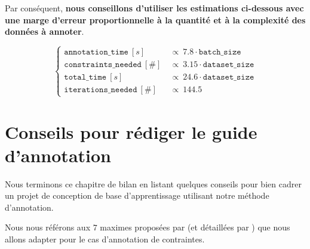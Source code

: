 			Par conséquent, \textbf{nous conseillons d'utiliser les estimations ci-dessous avec une marge d'erreur proportionnelle à la quantité et à la complexité des données à annoter}.
			
		\begin{equation}
			\label{equation:5.5-GUIDE-COUTS}
			\begin{cases}
				\texttt{annotation\_time}~[s] &
					~\propto~7.8 \cdot \texttt{batch\_size} \\
				\texttt{constraints\_needed}~[\#] &
					~\propto~3.15 \cdot \texttt{dataset\_size} \\
				\texttt{total\_time}~[s] &
					~\propto~24.6 \cdot \texttt{dataset\_size} \\
				\texttt{iterations\_needed}~[\#] &
					~\propto~144.5
			\end{cases}
		\end{equation}
	
	
	\newpage
	\section{Conseils pour rédiger le guide d'annotation}
		\label{section:5.6-GUIDE-REDIGER}
		
		Nous terminons ce chapitre de bilan en listant quelques conseils pour bien cadrer un projet de conception de base d'apprentissage utilisant notre méthode d'annotation.
		\begin{leftBarInformation}
			Nous nous référons aux $7$ maximes proposées par \cite{leech:1993:corpus-annotation-schemes} (et détaillées par \cite{fort:2022:manual-annotation-what}) que nous allons adapter pour le cas d'annotation de contraintes.
		\end{leftBarInformation}
		
